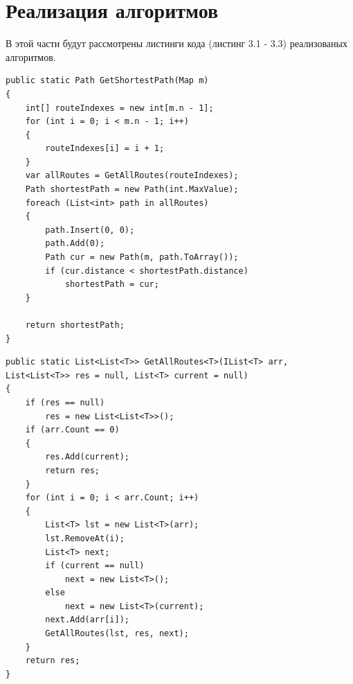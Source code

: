 \documentclass[12pt]{report}
\begin{document}
\section{Реализация алгоритмов}
В этой части будут рассмотрены листинги кода (листинг 3.1 - 3.3) реализованых алгоритмов.

\captionsetup{singlelinecheck = false, justification=raggedright}
\begin{lstlisting}[label=some-code,caption=Алгоритм поиска полным перебором]
public static Path GetShortestPath(Map m)
{
    int[] routeIndexes = new int[m.n - 1];
    for (int i = 0; i < m.n - 1; i++)
    {
        routeIndexes[i] = i + 1;
    }
    var allRoutes = GetAllRoutes(routeIndexes);
    Path shortestPath = new Path(int.MaxValue);
    foreach (List<int> path in allRoutes)
    {
        path.Insert(0, 0);
        path.Add(0);
        Path cur = new Path(m, path.ToArray());
        if (cur.distance < shortestPath.distance)
            shortestPath = cur;
    }

    return shortestPath;
}
\end{lstlisting}

\begin{lstlisting}[label=some-code,caption=Алгоритм поиска всех перестановок]
public static List<List<T>> GetAllRoutes<T>(IList<T> arr, List<List<T>> res = null, List<T> current = null)
{
    if (res == null)
        res = new List<List<T>>();
    if (arr.Count == 0)
    {
        res.Add(current);
        return res;
    }
    for (int i = 0; i < arr.Count; i++)
    {
        List<T> lst = new List<T>(arr);
        lst.RemoveAt(i);
        List<T> next;
        if (current == null)
            next = new List<T>();
        else
            next = new List<T>(current);
        next.Add(arr[i]);
        GetAllRoutes(lst, res, next);
    }
    return res;
}
\end{lstlisting}

\newpage
\end{document}

